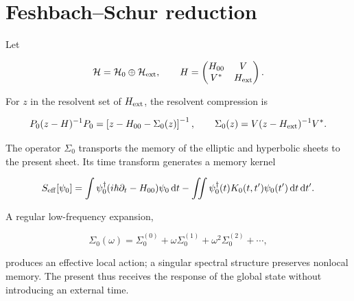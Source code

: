 \section{Feshbach--Schur reduction}

Let

\[
\mathcal H=\mathcal H_0\oplus\mathcal H_{\rm ext},
\qquad
H=
\begin{pmatrix}
H_{00}&V\\ V^*&H_{\rm ext}
\end{pmatrix}.
\]

For \(z\) in the resolvent set of \(H_{\rm ext}\), the resolvent
compression is

\begin{equation}
P_0(z-H)^{-1}P_0
=\left[z-H_{00}-\Sigma_0(z)\right]^{-1},
\qquad
\Sigma_0(z)=V(z-H_{\rm ext})^{-1}V^*.
\label{rm:eq:rm-feshbach-schur}
\end{equation}

The operator \(\Sigma_0\) transports the memory of the elliptic and hyperbolic
sheets to the present sheet. Its time transform generates a memory kernel

\[
S_{\rm eff}[\psi_0]
=\int\psi_0^\dagger(i\hbar\partial_t-H_{00})\psi_0\,\mathrm dt
-\iint\psi_0^\dagger(t)K_0(t,t')\psi_0(t')\,\mathrm dt\,\mathrm dt'.
\]

A regular low-frequency expansion,

\[
\Sigma_0(\omega)
=\Sigma_0^{(0)}+\omega\Sigma_0^{(1)}
+\omega^2\Sigma_0^{(2)}+\cdots,
\]

produces an effective local action; a singular spectral structure preserves
nonlocal memory. The present thus receives the response of the global state without
introducing an external time.
